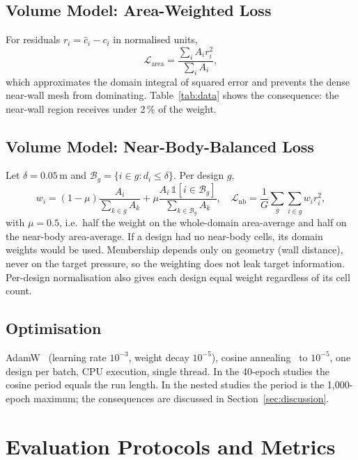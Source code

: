 \documentclass[journal]{IEEEtran}
\begin{document}
\subsection{Volume Model: Area-Weighted Loss}
For residuals $r_i=\hat c_i-c_i$ in normalised units,
\begin{equation}
\mathcal{L}_\mathrm{area}=\frac{\sum_i A_i r_i^2}{\sum_i A_i},
\end{equation}
which approximates the domain integral of squared error and prevents the dense
near-wall mesh from dominating. Table~\ref{tab:data} shows the consequence:
the near-wall region receives under 2\,\% of the weight.

\subsection{Volume Model: Near-Body-Balanced Loss}
Let $\delta=0.05$\,m and $\mathcal{B}_g=\{i\in g: d_i\le\delta\}$. Per design $g$,
\begin{equation}
w_i=(1-\mu)\frac{A_i}{\sum_{k\in g}A_k}
+\mu\frac{A_i\,\mathbb{1}[i\in\mathcal{B}_g]}{\sum_{k\in\mathcal{B}_g}A_k},
\quad
\mathcal{L}_\mathrm{nb}=\frac1G\sum_{g}\sum_{i\in g}w_i r_i^2,
\end{equation}
with $\mu=0.5$, i.e.\ half the weight on the whole-domain area-average and half
on the near-body area-average. If a design had no near-body cells, its domain
weights would be used. Membership depends only on geometry (wall distance),
never on the target pressure, so the weighting does not leak target
information. Per-design normalisation also gives each design equal weight
regardless of its cell count.

\subsection{Optimisation}
AdamW~\cite{loshchilov2019} (learning rate $10^{-3}$, weight decay $10^{-5}$),
cosine annealing~\cite{loshchilov2017sgdr} to $10^{-5}$, one design per batch,
CPU execution, single thread. In the 40-epoch studies the cosine period equals
the run length. In the nested studies the period is the 1{,}000-epoch maximum;
the consequences are discussed in Section~\ref{sec:discussion}.

\section{Evaluation Protocols and Metrics}
\label{sec:protocols}
\end{document}
